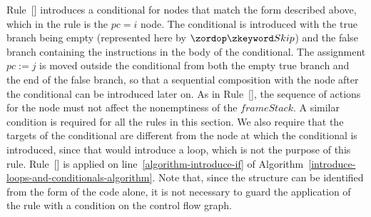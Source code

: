 Rule~[] introduces a conditional for
nodes that match the form described above, which in the rule is the
$pc = i$ node.
The conditional is introduced with the true branch being empty
(represented here by $\Skip$) and the false branch containing the
instructions in the body of the conditional.
The assignment $pc := j$ is moved outside the conditional from both
the empty true branch and the end of the false branch, so that a
sequential composition with the node after the conditional can be
introduced later on.
As in Rule~[], the sequence of
actions for the node must not affect the nonemptiness of the
$frameStack$.
A similar condition is required for all the rules in this section.
We also require that the targets of the conditional are different from
the node at which the conditional is introduced, since that would
introduce a loop, which is not the purpose of this rule.
Rule~[] is applied on
line~\ref{algorithm-introduce-if} of
Algorithm~\ref{introduce-loops-and-conditionals-algorithm}.
Note that, since the structure can be identified from the form of the
\Circus{} code alone, it is not necessary to guard the application of
the rule with a condition on the control flow graph.


